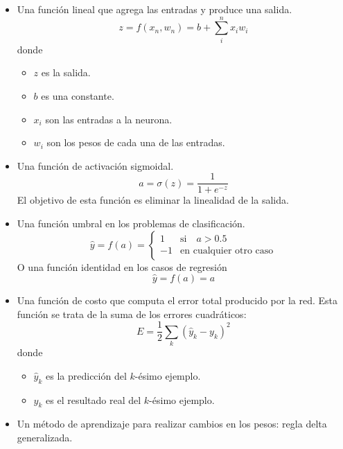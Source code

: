 \documentclass[11pt,twoside,titlepage,a4paper]{article}
\numberwithin{equation}{section} %
\theoremstyle{usual}
\begin{document}
\begin{itemize}
    \item Una función lineal que agrega las entradas y produce una salida.
    \begin{equation}\label{agregacion}
        z=f(x_n,w_n)=b+\sum_i^nx_iw_i
    \end{equation}
    donde
    \begin{itemize}
        \item $z$ es la salida.
        \item $b$ es una constante.
        \item $x_i$ son las entradas a la neurona.
        \item $w_i$ son los pesos de cada una de las entradas.
    \end{itemize}
    \item Una función de activación sigmoidal.
    \begin{equation}
        a=\sigma(z)=\frac{1}{1+e^{-z}}
    \end{equation}
    El objetivo de esta función es eliminar la linealidad de la salida.
    \item Una función umbral en los problemas de clasificación.
    \begin{equation}
        \hat{y}=f(a)=
    \begin{cases}
        1 & \text{si}\quad a>0.5 \\
        -1 & \text{en cualquier otro caso}
    \end{cases}
    \end{equation}
    O una función identidad en los casos de regresión 
    \begin{equation}
        \hat{y}=f(a)=a
    \end{equation}
    \item Una función de costo que computa el error total producido por la red. Esta
    función se trata de la suma de los errores cuadráticos:
    \begin{equation}\label{f_costo}
        E=\frac 12 \sum_k(\hat{y}_k-y_k)^2
    \end{equation}
    donde
    \begin{itemize}
        \item $\hat{y}_k$ es la predicción del $k$-ésimo ejemplo.
        \item $y_k$ es el resultado real del $k$-ésimo ejemplo.
    \end{itemize}
    \item Un método de aprendizaje para realizar cambios en los pesos: regla
    delta generalizada.
\end{itemize}
\end{document}
